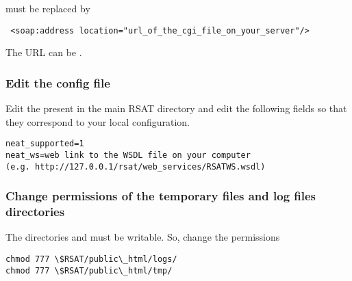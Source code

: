 \documentclass{book}
\begin{document}
must be replaced by

\begin{lstlisting}
 <soap:address location="url_of_the_cgi_file_on_your_server"/>
\end{lstlisting}

The URL can be .

\subsubsection{Edit the \neat config file}

Edit the  present in the main RSAT directory and edit the following fields so that they correspond to your local configuration.

\begin{lstlisting}
neat_supported=1
neat_ws=web link to the WSDL file on your computer
(e.g. http://127.0.0.1/rsat/web_services/RSATWS.wsdl)
\end{lstlisting}

\subsubsection{Change permissions of the temporary files and log files directories}

The directories  and  must be writable. So, change the permissions

\begin{lstlisting}
chmod 777 \$RSAT/public\_html/logs/
chmod 777 \$RSAT/public\_html/tmp/
\end{lstlisting}
\end{document}
